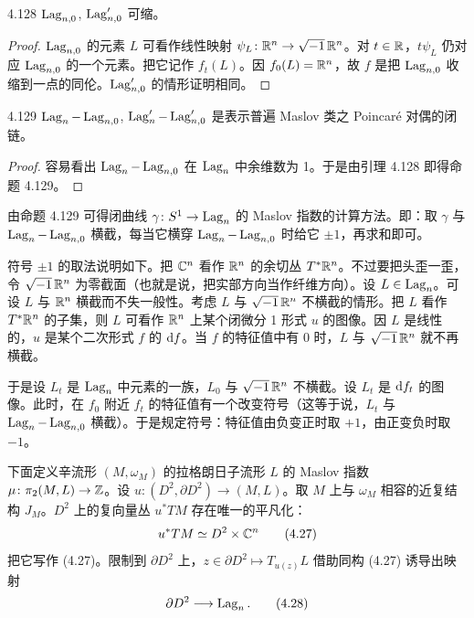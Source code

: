 \begin{lemma*}{4.128}
  $\operatorname{Lag}_{n,0}$, $\operatorname{Lag}'_{n,0}$ 可缩。
\end{lemma*}

\begin{proof}
  $\operatorname{Lag}_{n,0}$ 的元素 $L$ 可看作线性映射 $\psi_L\colon\mathbb{R}^n\to\sqrt{-1}\,\mathbb{R}^n$。对 $t\in\mathbb{R}$，$t\psi_L$ 仍对应 $\operatorname{Lag}_{n,0}$ 的一个元素。把它记作 $f_t(L)$。因 $f_0(L)=\mathbb{R}^n$，故 $f$ 是把 $\operatorname{Lag}_{n,0}$ 收缩到一点的同伦。$\operatorname{Lag}'_{n,0}$ 的情形证明相同。
\end{proof}

\begin{proposition*}{4.129}
  $\operatorname{Lag}_n-\operatorname{Lag}_{n,0}$, $\operatorname{Lag}'_n-\operatorname{Lag}'_{n,0}$ 是表示普遍 Maslov 类之 Poincaré 对偶的闭链。
\end{proposition*}

\begin{proof}
  容易看出 $\operatorname{Lag}_n-\operatorname{Lag}_{n,0}$ 在 $\operatorname{Lag}_n$ 中余维数为 1。于是由引理 4.128 即得命题 4.129。
\end{proof}

由命题 4.129 可得闭曲线 $\gamma\colon S^1\to\operatorname{Lag}_n$ 的 Maslov 指数的计算方法。即：取 $\gamma$ 与 $\operatorname{Lag}_n-\operatorname{Lag}_{n,0}$ 横截，每当它横穿 $\operatorname{Lag}_n-\operatorname{Lag}_{n,0}$ 时给它 $\pm 1$，再求和即可。

符号 $\pm 1$ 的取法说明如下。把 $\mathbb{C}^n$ 看作 $\mathbb{R}^n$ 的余切丛 $T^*\mathbb{R}^n$。不过要把头歪一歪，令 $\sqrt{-1}\,\mathbb{R}^n$ 为零截面（也就是说，把实部方向当作纤维方向）。设 $L\in\operatorname{Lag}_n$。可设 $L$ 与 $\mathbb{R}^n$ 横截而不失一般性。考虑 $L$ 与 $\sqrt{-1}\,\mathbb{R}^n$ 不横截的情形。把 $L$ 看作 $T^*\mathbb{R}^n$ 的子集，则 $L$ 可看作 $\mathbb{R}^n$ 上某个闭微分 1 形式 $u$ 的图像。因 $L$ 是线性的，$u$ 是某个二次形式 $f$ 的 $\mathrm{d} f$。当 $f$ 的特征值中有 0 时，$L$ 与 $\sqrt{-1}\,\mathbb{R}^n$ 就不再横截。

于是设 $L_t$ 是 $\operatorname{Lag}_n$ 中元素的一族，$L_0$ 与 $\sqrt{-1}\,\mathbb{R}^n$ 不横截。设 $L_t$ 是 $\mathrm{d} f_t$ 的图像。此时，在 $f_0$ 附近 $f_t$ 的特征值有一个改变符号（这等于说，$L_t$ 与 $\operatorname{Lag}_n-\operatorname{Lag}_{n,0}$ 横截）。于是规定符号：特征值由负变正时取 $+1$，由正变负时取 $-1$。

下面定义辛流形 $(M,\omega_M)$ 的拉格朗日子流形 $L$ 的 Maslov 指数 $\mu\colon\pi_2(M,L)\to\mathbb{Z}$。设 $u\colon(D^2,\partial D^2)\to(M,L)$。取 $M$ 上与 $\omega_M$ 相容的近复结构 $J_M$。$D^2$ 上的复向量丛 $u^*TM$ 存在唯一的平凡化：
\begin{equation}
  u^*TM\simeq D^2\times\mathbb{C}^n \tag{4.27}
\end{equation}
把它写作 (4.27)。限制到 $\partial D^2$ 上，$z\in\partial D^2\mapsto T_{u(z)}L$ 借助同构 (4.27) 诱导出映射
\begin{equation}
  \partial D^2\longrightarrow\operatorname{Lag}_n. \tag{4.28}
\end{equation}

